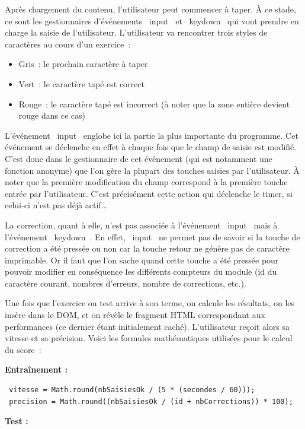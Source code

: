 \documentclass[a4paper,12pt]{article}
\begin{document}
Après chargement du contenu, l'utilisateur peut commencer à taper. À ce stade, ce sont les gestionnaires d'événements \og~input~\fg{} et \og~keydown~\fg{} qui vont prendre en charge la saisie de l'utilisateur. L'utilisateur va rencontrer trois styles de caractères au cours d'un exercice~:

\begin{itemize}
 \item{Gris~: le prochain caractère à taper}
 \item{Vert~: le caractère tapé est correct}
 \item{Rouge~: le caractère tapé est incorrect (à noter que la zone entière devient rouge dans ce cas) }
\end{itemize}

L'événement \og~input~\fg{} englobe ici la partie la plus importante du programme. Cet événement se déclenche en effet à chaque fois que le champ de saisie est modifié. C'est donc dans le gestionnaire de cet événement (qui est notamment une fonction anonyme) que l'on gère la plupart des touches saisies par l'utilisateur. À noter que la première modification du champ correspond à la première touche entrée par l'utilisateur. C'est précisément cette action qui déclenche le timer, si celui-ci n'est pas déjà actif...

La correction, quant à elle, n'est pas associée à l'événement \og~input~\fg{} mais à l'événement \og~keydown~\fg. En effet, \og~input~\fg{} ne permet pas de savoir si la touche de correction a été pressée ou non car la touche retour ne génère pas de caractère imprimable. Or il faut que l'on sache quand cette touche a été pressée pour pouvoir modifier en conséquence les différents compteurs du module (id du caractère courant, nombres d'erreurs, nombre de corrections, etc.).

Une fois que l'exercice ou test arrive à son terme, on calcule les résultats, on les insère dans le DOM, et on révèle le fragment HTML correspondant aux performances (ce dernier étant initialement caché). L'utilisateur reçoit alors sa vitesse et sa précision. Voici les formules mathématiques utilisées pour le calcul du score~:

\textbf{Entraînement :}

\begin{lstlisting}
 vitesse = Math.round(nbSaisiesOk / (5 * (secondes / 60)));
 precision = Math.round((nbSaisiesOk / (id + nbCorrections)) * 100);
\end{lstlisting}


\textbf{Test :}
\end{document}
